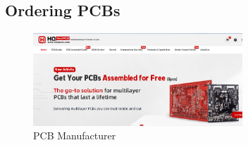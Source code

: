 \subsection{Ordering PCBs}


\begin{figure}[h]
    \centering
    \includegraphics[width=0.7\textwidth]{Figures/Manufacture/pcb_manufacture_example.png}
    \caption{PCB Manufacturer}
    \label{fig:pcbmanufacturer}
  \end{figure}